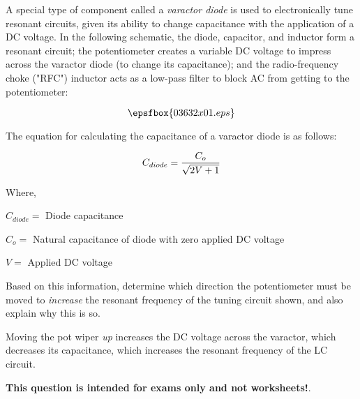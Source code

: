 

A special type of component called a {\it varactor diode} is used to electronically tune resonant circuits, given its ability to change capacitance with the application of a DC voltage.  In the following schematic, the diode, capacitor, and inductor form a resonant circuit; the potentiometer creates a variable DC voltage to impress across the varactor diode (to change its capacitance); and the radio-frequency choke ("RFC") inductor acts as a low-pass filter to block AC from getting to the potentiometer:

$$\epsfbox{03632x01.eps}$$

The equation for calculating the capacitance of a varactor diode is as follows:

$$C_{diode} = {C_o \over {\sqrt{2V + 1}}}$$

\noindent
Where,

$C_{diode} =$ Diode capacitance

$C_o =$ Natural capacitance of diode with zero applied DC voltage

$V = $ Applied DC voltage 

\vskip 10pt

Based on this information, determine which direction the potentiometer must be moved to {\it increase} the resonant frequency of the tuning circuit shown, and also explain why this is so.

\vskip 30pt







Moving the pot wiper {\it up} increases the DC voltage across the varactor, which decreases its capacitance, which increases the resonant frequency of the LC circuit.







{\bf This question is intended for exams only and not worksheets!}.



